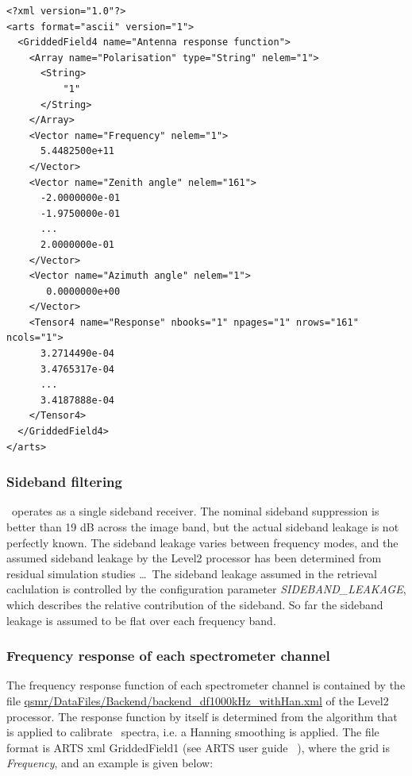 %
\lstset{language=XML}
\begin{lstlisting}
<?xml version="1.0"?>
<arts format="ascii" version="1">
  <GriddedField4 name="Antenna response function">
    <Array name="Polarisation" type="String" nelem="1">
      <String>
          "1"
      </String>
    </Array>
    <Vector name="Frequency" nelem="1">
      5.4482500e+11
    </Vector>
    <Vector name="Zenith angle" nelem="161">
      -2.0000000e-01
      -1.9750000e-01
      ...
      2.0000000e-01
    </Vector>
    <Vector name="Azimuth angle" nelem="1">     
       0.0000000e+00
    </Vector>
    <Tensor4 name="Response" nbooks="1" npages="1" nrows="161" ncols="1">
      3.2714490e-04
      3.4765317e-04 
      ...
      3.4187888e-04 
    </Tensor4>
  </GriddedField4>
</arts>
\end{lstlisting}

\subsubsection*{Sideband filtering}


\smr\ operates as a single sideband receiver. 
The nominal sideband suppression is better than 19 dB across the image band,
but the actual sideband leakage is not perfectly known.
The sideband leakage varies between frequency modes, and the
assumed sideband leakage by the Level2 processor has been determined
from residual simulation studies \dots{}\
The sideband leakage assumed in the retrieval caclulation
is controlled by the configuration parameter \emph{SIDEBAND\_LEAKAGE},
which describes the relative contribution of the sideband. So far the sideband 
leakage is assumed to be flat over each frequency band.

\subsubsection*{Frequency response of each spectrometer channel}

The frequency response function of each spectrometer channel
is contained by the file
\url{qsmr/DataFiles/Backend/backend\_df1000kHz\_withHan.xml}
of the Level2 processor.
The response function by itself is determined from
the algorithm that is applied to calibrate \smr\ spectra,
i.e. a Hanning smoothing is applied.
The file format is ARTS xml GriddedField1 (see ARTS user guide ~\citep{artsug}),
where the grid is \emph{Frequency}, and an example is given below:


